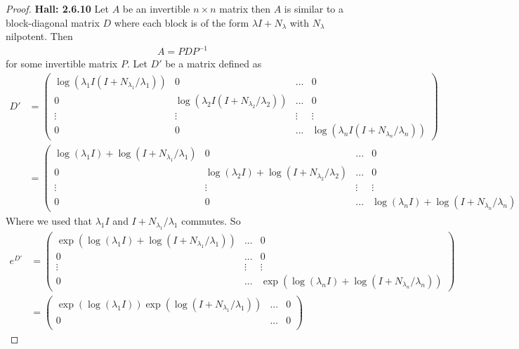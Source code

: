 \documentclass[11pt]{article}
\theoremstyle{definition}
\begin{document}
\begin{proof}{\textbf{Hall: 2.6.10}}
    Let $A$ be an invertible $n \times n$ matrix then $A$ is similar to a
    block-diagonal matrix $D$ where each block is of the form
    $\lambda I + N_\lambda$ with $N_\lambda$ nilpotent. Then
    \begin{align*}
        A = PDP^{-1}
    \end{align*}
    for some invertible matrix $P$.
    Let $D'$ be a matrix defined as
    \begin{align*}
        D' &= \begin{pmatrix}
            \log(\lambda_1I(I + N_{\lambda_1}/\lambda_1)) & 0 & ... & 0 \\
            0 & \log(\lambda_2I (I + N_{\lambda_2}/\lambda_2)) & ... & 0 \\
            \vdots & \vdots & \vdots & \vdots\\
            0 & 0 & ... & \log(\lambda_nI(I + N_{\lambda_n}/\lambda_n))
        \end{pmatrix}\\
        &= \begin{pmatrix}
            \log(\lambda_1I) + \log(I + N_{\lambda_1}/\lambda_1) & 0 & ... & 0 \\
            0 & \log(\lambda_2I) + \log(I + N_{\lambda_2}/\lambda_2) & ... & 0 \\
            \vdots & \vdots & \vdots & \vdots\\
            0 & 0 & ... & \log(\lambda_nI)+ \log(I + N_{\lambda_n}/\lambda_n)
        \end{pmatrix}
    \end{align*}
    Where we used that $\lambda_1I$ and $I + N_{\lambda_1}/\lambda_1$ commutes.
    So
    \begin{align*}
        e^{D'} &= \begin{pmatrix}
            \exp(\log(\lambda_1I) + \log(I + N_{\lambda_1}/\lambda_1)) & ... & 0 \\
            0  & ... & 0 \\
            \vdots & \vdots & \vdots\\
            0 & ... & \exp(\log(\lambda_nI)+ \log(I + N_{\lambda_n}/\lambda_n))
        \end{pmatrix}\\
        &= \begin{pmatrix}
            \exp(\log(\lambda_1I))\exp(\log(I + N_{\lambda_1}/\lambda_1)) & ... & 0 \\
            0  & ... & 0 \\

\end{pmatrix}
\end{align*}
\end{proof}
\end{document}
